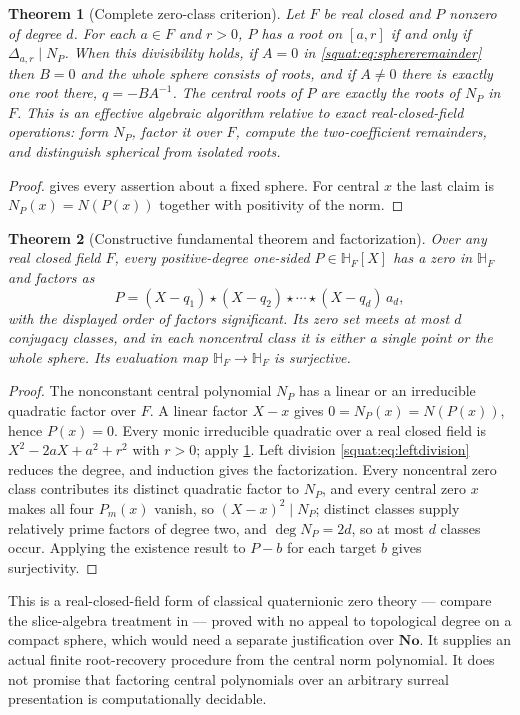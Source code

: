 \documentclass[11pt,letterpaper]{article}
\numberwithin{equation}{section}
\newtheorem{theorem}{Theorem}[section]
\theoremstyle{definition}
\theoremstyle{remark}
\newcommand{\No}{\mathbf{No}}
\newcommand{\HF}{\mathbb H_F}
\begin{document}
\begin{theorem}[Complete zero-class criterion]\label{squat:thm:polynomialzeros}
Let $F$ be real closed and $P$ nonzero of degree $d$. For each $a\in F$ and $r>0$, $P$
has a root on $[a,r]$ if and only if $\Delta_{a,r}\mid N_P$. \emph{When this
divisibility holds}, if $A=0$ in
\cref{squat:eq:sphereremainder} then $B=0$ and the whole sphere consists of roots, and if
$A\ne0$ there is exactly one root there, $q=-BA^{-1}$. The central roots of $P$ are
exactly the roots of $N_P$ in $F$. This is an effective algebraic algorithm relative to
exact real-closed-field operations: form $N_P$, factor it over $F$, compute the
two-coefficient remainders, and distinguish spherical from isolated roots.
\end{theorem}
\begin{proof}
 gives every assertion about a fixed sphere. For central
$x$ the last claim is $N_P(x)=N(P(x))$ together with positivity of the norm.
\end{proof}

\begin{theorem}[Constructive fundamental theorem and factorization]\label{squat:thm:fta}
Over any real closed field $F$, every positive-degree one-sided $P\in\HF[X]$ has a zero
in $\HF$ and factors as
\[
 P=(X-q_1)\star(X-q_2)\star\cdots\star(X-q_d)\,a_d,
\]
with the displayed order of factors significant. Its zero set meets at most $d$ conjugacy
classes, and in each noncentral class it is either a single point or the whole sphere. Its
evaluation map $\HF\to\HF$ is surjective.
\end{theorem}
\begin{proof}
The nonconstant central polynomial $N_P$ has a linear or an irreducible quadratic factor
over $F$. A linear factor $X-x$ gives $0=N_P(x)=N(P(x))$, hence $P(x)=0$. Every monic
irreducible quadratic over a real closed field is $X^2-2aX+a^2+r^2$ with $r>0$; apply
\cref{squat:thm:polynomialzeros}. Left division \cref{squat:eq:leftdivision} reduces the
degree, and induction gives the factorization. Every noncentral zero class contributes its
distinct quadratic factor to $N_P$, and every central zero $x$ makes all four $P_m(x)$
vanish, so $(X-x)^2\mid N_P$; distinct classes supply relatively prime factors of degree
two, and $\deg N_P=2d$, so at most $d$ classes occur. Applying the existence result to
$P-b$ for each target $b$ gives surjectivity.
\end{proof}

This is a real-closed-field form of classical quaternionic zero theory --- compare the
slice-algebra treatment in \cite{GP} --- proved with no appeal to topological degree on a
compact sphere, which would need a separate justification over $\No$. It supplies an
actual finite root-recovery procedure from the central norm polynomial. It does not
promise that factoring central polynomials over an arbitrary surreal presentation is
computationally decidable.
\end{document}
